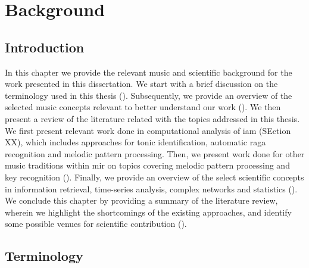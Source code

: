 
\chapter{Background}
\label{chap:background}

\section{Introduction}

In this chapter we provide the relevant music and scientific background for the work presented in this dissertation. We start with a brief discussion on the terminology used in this thesis (). Subsequently, we provide an overview of the selected music concepts relevant to better understand our work (). We then present a review of the literature related with the topics addressed in this thesis. We first present relevant work done in computational analysis of \gls{iam} (SEction XX), which includes approaches for tonic identification, automatic \gls{raga} recognition and melodic pattern processing. Then, we present work done for other music traditions within \gls{mir} on topics covering melodic pattern processing and key recognition (). Finally, we provide an overview of the select scientific concepts in information retrieval, time-series analysis, complex networks and statistics (). We conclude this chapter by providing a summary of the literature review, wherein we highlight the shortcomings of the existing approaches, and identify some possible venues for scientific contribution (). 

\section{Terminology}
\label{sec:background_terminology}


